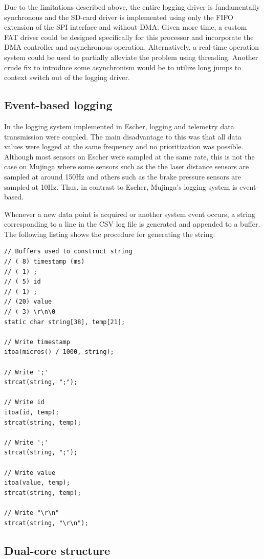 Due to the limitations described above, the entire logging driver is fundamentally synchronous and the SD-card driver is implemented using only the FIFO extension of the SPI interface and without DMA. Given more time, a custom FAT driver could be designed specifically for this processor and incorporate the DMA controller and asynchronous operation. Alternatively, a real-time operation system could be used to partially alleviate the problem using threading. Another crude fix to introduce some asynchronism would be to utilize long jumps to context switch out of the logging driver.

\subsection{Event-based logging}

In the logging system implemented in Escher, logging and telemetry data transmission were coupled. The main disadvantage to this was that all data values were logged at the same frequency and no prioritization was possible. Although most sensors on Escher were sampled at the same rate, this is not the case on Mujinga where some sensors such as the the laser distance sensors are sampled at around 150Hz and others such as the brake pressure sensors are sampled at 10Hz. Thus, in contrast to Escher, Mujinga's logging system is event-based.

Whenever a new data point is acquired or another system event occurs, a string corresponding to a line in the CSV log file is generated and appended to a buffer. The following listing shows the procedure for generating the string:

\begin{verbatim}
// Buffers used to construct string
// ( 8) timestamp (ms)
// ( 1) ;
// ( 5) id
// ( 1) ;
// (20) value
// ( 3) \r\n\0
static char string[38], temp[21];

// Write timestamp
itoa(micros() / 1000, string);

// Write ';'
strcat(string, ";");

// Write id
itoa(id, temp);
strcat(string, temp);

// Write ';'
strcat(string, ";");

// Write value
itoa(value, temp);
strcat(string, temp);

// Write "\r\n"
strcat(string, "\r\n");
\end{verbatim}

\subsection{Dual-core structure}

